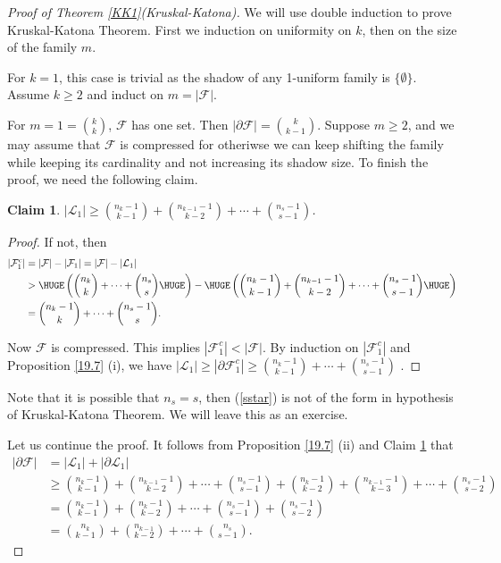 \documentclass{article}
\newtheorem{claim}[theorem]{Claim}
\theoremstyle{definition}
\begin{document}
\begin{proof} [Proof of Theorem \ref{KK1}(Kruskal-Katona)] We will use double induction to prove Kruskal-Katona Theorem. First we induction on uniformity on $k$, then on the size of the family $m$. 

For $k=1$, this case is trivial as the shadow of any 1-uniform family is $\{\emptyset\}$. Assume $k\geq 2$ and induct on $m=|\mathcal{F}|$.  

For $m=1=\binom{k}{k}$, $\mathcal{F}$ has one set. Then $|\partial\mathcal{F}|=\binom{k}{k-1}$. Suppose $m\geq 2$, and we may assume that $\mathcal{F}$ is compressed for otheriwse we can keep shifting the family while keeping its cardinality and not increasing its shadow size. To finish the proof, we need the following claim. 
    \begin{claim}\label{L1}
        $|\mathcal{L}_1|\geq \binom{n_k-1}{k-1}+\binom{n_{k-1}-1}{k-2}+\cdots+\binom{n_s-1}{s-1}$. 
    \end{claim}

\begin{proof}
 If not, then 
 \begin{equation}\label{sstar}
    \begin{aligned}
 |\mathcal{F}_1^c|&=|\mathcal{F}|-|\mathcal{F}_1|=|\mathcal{F}|-|\mathcal{L}_1|\\
 &>\HUGE\left(\binom{n_k}{k}+\cdots+\binom{n_s}{s} \HUGE\right)- \HUGE\left(\binom{n_k-1}{k-1}+\binom{n_{k-1}-1}{k-2}+\cdots+\binom{n_s-1}{s-1} \HUGE\right)\\
 &= \binom{n_k-1}{k}+\cdots+\binom{n_s-1}{s}.
 \end{aligned}  
 \end{equation}

 Now $\mathcal{F}$ is compressed. This implies $|\mathcal{F}_1^c|< |\mathcal{F}|$. By induction on $|\mathcal{F}_1^c|$ and Proposition \ref{19.7} (i), we have $|\mathcal{L}_1|\geq |\partial\mathcal{F}_1^c|\geq \binom{n_k-1}{k-1}+\cdots+\binom{n_s-1}{s-1}$ .
\end{proof}
Note that it is possible that $n_s=s$, then (\ref{sstar}) is not of the form in hypothesis of Kruskal-Katona Theorem. We will leave this as an exercise. 

Let us continue the proof. It follows from  Proposition \ref{19.7} (ii) and Claim \ref{L1} that 
\begin{align*}
 |\partial\mathcal{F}|&=|\mathcal{L}_1|+|\partial\mathcal{L}_1|\\
 &\geq  \binom{n_k-1}{k-1}+\binom{n_{k-1}-1}{k-2}+\cdots+\binom{n_s-1}{s-1}+  \binom{n_k-1}{k-2}+\binom{n_{k-1}-1}{k-3}+\cdots+\binom{n_s-1}{s-2} \\
&= \binom{n_k-1}{k-1} +\binom{n_k-1}{k-2} +\cdots+\binom{n_s-1}{s-1}+\binom{n_s-1}{s-2}\\
&= \binom{n_k}{k-1}+\binom{n_{k-1}}{k-2}+\cdots+\binom{n_s}{s-1}. 
\end{align*}
\end{proof}
\end{document}
